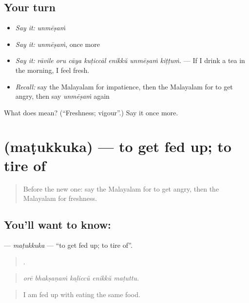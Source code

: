 \subsection*{Your turn}
\begin{itemize}
\raggedright
  \item \emph{Say it:} \emph{unmēṣaṁ}
  \item \emph{Say it:} \emph{unmēṣaṁ}, once more
  \item \emph{Say it:} \emph{rāvile oru cāya kuṭiccāl enikkŭ unmēṣaṁ kiṭṭuṁ.} — If I drink a tea in the morning, I feel fresh.
  \item \emph{Recall:} say the Malayalam for impatience, then the Malayalam for to get angry, then say \emph{unmēṣaṁ} again
\end{itemize}

\begin{tcolorbox}[breakable,colback=teal!4,colframe=teal!35!black,title={Before you move on}]
What does  mean? (\textquotedblleft{}Freshness; vigour\textquotedblright{}.) Say it once more.
\end{tcolorbox}
\section[\texorpdfstring{\ml{മടുക്കുക} (maṭukkuka)}{മടുക്കുക (maṭukkuka)}]{ (maṭukkuka) — to get fed up; to tire of}

\label{lesson:ML-C522-matukkuka}



\begin{quote}
Before the new one: say the Malayalam for to get angry, then the Malayalam for freshness.
\end{quote}

\subsection*{You'll want to know: }
\textbf{} — \emph{maṭukkuka} — \textquotedblleft{}to get fed up; to tire of\textquotedblright{}.

\begin{quote}
    .
\end{quote}

\begin{quote}
\emph{orē bhakṣaṇaṁ kaḻiccŭ enikkŭ maṭuttu.}
\end{quote}

\begin{quote}
I am fed up with eating the same food.
\end{quote}

